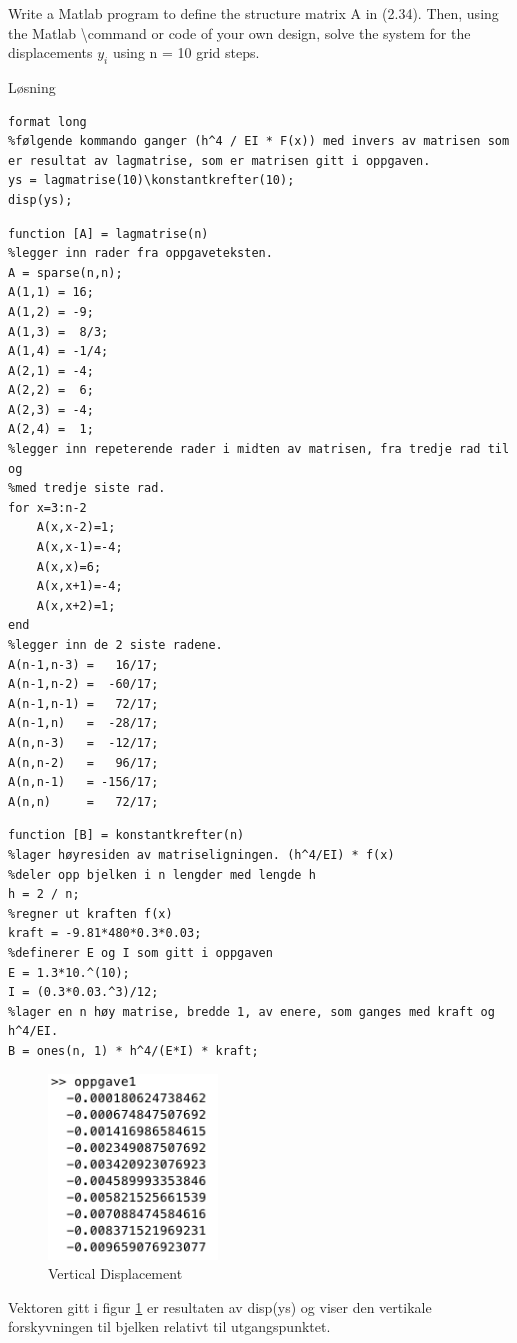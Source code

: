 % 

Write a Matlab program to define the structure matrix A in (2.34). Then, using the Matlab \textbackslash command or code of your own design, solve the system for the displacements $y_i$ using n = 10 grid steps.

\vspace{5mm}
Løsning

\begin{lstlisting}[caption={oppgave1.m}]
format long
%følgende kommando ganger (h^4 / EI * F(x)) med invers av matrisen som er resultat av lagmatrise, som er matrisen gitt i oppgaven.
ys = lagmatrise(10)\konstantkrefter(10);
disp(ys); 
\end{lstlisting}

\begin{lstlisting}[caption={lagmatrise.m}]
function [A] = lagmatrise(n)
%legger inn rader fra oppgaveteksten. 
A = sparse(n,n);
A(1,1) = 16;
A(1,2) = -9;
A(1,3) =  8/3;
A(1,4) = -1/4;
A(2,1) = -4;
A(2,2) =  6;
A(2,3) = -4;
A(2,4) =  1;
%legger inn repeterende rader i midten av matrisen, fra tredje rad til og
%med tredje siste rad. 
for x=3:n-2
    A(x,x-2)=1;
    A(x,x-1)=-4;
    A(x,x)=6;
    A(x,x+1)=-4;
    A(x,x+2)=1;
end
%legger inn de 2 siste radene. 
A(n-1,n-3) =   16/17;
A(n-1,n-2) =  -60/17;
A(n-1,n-1) =   72/17;
A(n-1,n)   =  -28/17;
A(n,n-3)   =  -12/17;
A(n,n-2)   =   96/17;
A(n,n-1)   = -156/17;
A(n,n)     =   72/17;
\end{lstlisting}

\begin{lstlisting}[caption={konstantkrefter.m}]
function [B] = konstantkrefter(n)
%lager høyresiden av matriseligningen. (h^4/EI) * f(x) 
%deler opp bjelken i n lengder med lengde h 
h = 2 / n;        
%regner ut kraften f(x) 
kraft = -9.81*480*0.3*0.03; 
%definerer E og I som gitt i oppgaven
E = 1.3*10.^(10); 
I = (0.3*0.03.^3)/12; 
%lager en n høy matrise, bredde 1, av enere, som ganges med kraft og h^4/EI.
B = ones(n, 1) * h^4/(E*I) * kraft;
\end{lstlisting}

\vspace{3mm}

\begin{figure}[h]
    \centering
    \includegraphics[width=0.4\textwidth]{sections/Exercise1/oppgave1disp}
    \caption{Vertical Displacement}
    \label{fig:verticaldisp}
\end{figure}
 
Vektoren gitt i figur \ref{fig:verticaldisp} er resultaten av disp(ys) og viser den vertikale forskyvningen til bjelken relativt til utgangspunktet.


% 